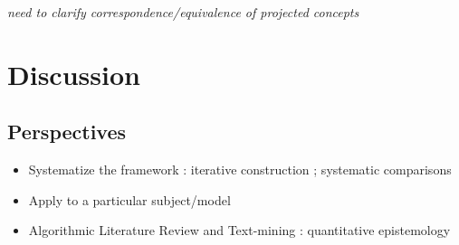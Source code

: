 \documentclass[fleqn,10pt]{wlscirep}
\begin{document}
\textit{need to clarify correspondence/equivalence of projected concepts}


\section*{Discussion}

\subsection*{Perspectives}

\begin{itemize}
\item Systematize the framework : iterative construction ; systematic comparisons
\item Apply to a particular subject/model
\item Algorithmic Literature Review and Text-mining : quantitative epistemology
\end{itemize}








%
















%








\end{document}
